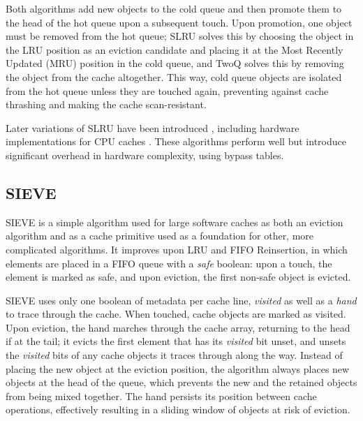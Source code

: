 \documentclass[letterpaper]{article}
\begin{document}
Both algorithms add new objects to the cold queue
and then promote them to the head of the hot queue upon a subsequent touch.
Upon promotion, one object must be removed from the hot queue;
SLRU solves this by choosing the object in the LRU position as an eviction candidate
and placing it at the Most Recently Updated (MRU) position in the cold queue,
and TwoQ solves this by removing the object from the cache altogether.
This way, cold queue objects are isolated from the hot queue unless they are touched again,
preventing against cache thrashing and making the cache scan-resistant.

Later variations of SLRU have been introduced \cite{SSLRU},
including hardware implementations for CPU caches
\cite{DuelingSLRU}\cite{LimitedSLRU}\cite{FixedSLRU}\cite{FixedSLRUEnhancements}.
These algorithms perform well but introduce significant overhead in hardware complexity,
using bypass tables.

\subsection{SIEVE}

SIEVE is a simple algorithm used for large software caches as both an eviction algorithm
and as a cache primitive used as a foundation for other, more complicated algorithms. \cite{SIEVE}
It improves upon LRU and FIFO Reinsertion,
in which elements are placed in a FIFO queue with a \textit{safe} boolean:
upon a touch, the element is marked as safe, and upon eviction,
the first non-safe object is evicted.

SIEVE uses only one boolean of metadata per cache line, \textit{visited}
as well as a \textit{hand} to trace through the cache.
When touched, cache objects are marked as visited.
Upon eviction, the hand marches through the cache array, returning to the head if at the tail;
it evicts the first element that has its \textit{visited} bit unset,
and unsets the \textit{visited} bits of any cache objects it traces through along the way.
Instead of placing the new object at the eviction position,
the algorithm always places new objects at the head of the queue,
which prevents the new and the retained objects from being mixed together.
The hand persists its position between cache operations,
effectively resulting in a sliding window of objects at risk of eviction.
\end{document}
